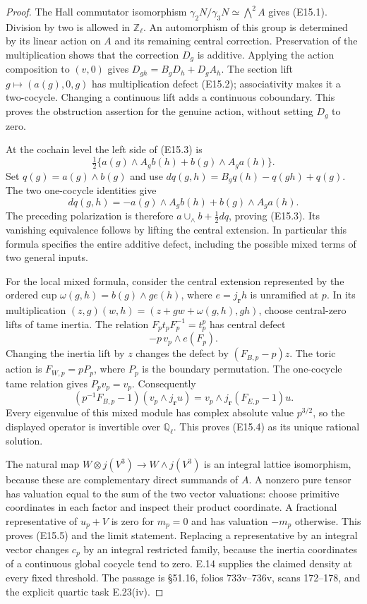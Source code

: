 \begin{proof}
The Hall commutator isomorphism
$\gamma_2N/\gamma_3N\simeq\bigwedge^2A$ gives (E15.1).
Division by two is allowed in $\mathbb Z_\ell$.
An automorphism of this group is determined by its
linear action on $A$ and its remaining central correction.
Preservation of the multiplication shows that the
correction $D_g$ is additive. Applying the action
composition to $(v,0)$ gives
$D_{gh}=B_gD_h+D_gA_h$.
The section lift $g\mapsto(a(g),0,g)$ has multiplication
defect (E15.2); associativity makes it a two-cocycle.
Changing a continuous lift adds a continuous coboundary.
This proves the obstruction assertion for the genuine
action, without setting $D_g$ to zero.

At the cochain level the left side of (E15.3) is
\[
 \tfrac12\{a(g)\wedge A_gb(h)+b(g)\wedge A_ga(h)\}.
\]
Set $q(g)=a(g)\wedge b(g)$ and use
$dq(g,h)=B_gq(h)-q(gh)+q(g)$. The two one-cocycle
identities give
\[
 dq(g,h)=-a(g)\wedge A_gb(h)+b(g)\wedge A_ga(h).
\]
The preceding polarization is therefore
$a\cup_\wedge b+\tfrac12dq$, proving (E15.3).
Its vanishing equivalence follows by lifting the
central extension. In particular this formula
specifies the entire additive defect, including
the possible mixed terms of two general inputs.

For the local mixed formula, consider the central
extension represented by the ordered cup
$\omega(g,h)=b(g)\wedge g e(h)$, where
$e=j_{\mathbf r}h$ is unramified at $p$.
In its multiplication
$(z,g)(w,h)=(z+gw+\omega(g,h),gh)$, choose central-zero
lifts of tame inertia. The relation
$F_pt_pF_p^{-1}=t_p^p$ has central defect
\[
 -p\,v_p\wedge e(F_p).
\]
Changing the inertia lift by $z$ changes the defect by
$(F_{B,p}-p)z$. The toric action is $F_{W,p}=pP_p$,
where $P_p$ is the boundary permutation. The
one-cocycle tame relation gives $P_pv_p=v_p$.
Consequently
\[
 (p^{-1}F_{B,p}-1)
       (v_p\wedge j_{\mathbf r}u)
   =v_p\wedge j_{\mathbf r}(F_{E,p}-1)u.
\]
Every eigenvalue of this mixed module has complex
absolute value $p^{3/2}$, so the displayed operator
is invertible over $\mathbb Q_\ell$. This proves
(E15.4) as its unique rational solution.

The natural map $W\otimes j(V^3)\to W\wedge j(V^3)$
is an integral lattice isomorphism, because these
are complementary direct summands of $A$.
A nonzero pure tensor has valuation equal to the
sum of the two vector valuations: choose primitive
coordinates in each factor and inspect their
product coordinate. A fractional representative of
$u_p+V$ is zero for $m_p=0$ and has valuation $-m_p$
otherwise. This proves (E15.5) and the limit statement.
Replacing a representative by an integral vector
changes $c_p$ by an integral restricted family,
because the inertia coordinates of a continuous
global cocycle tend to zero. E.14 supplies the
claimed density at every fixed threshold.
The passage is \S51.16, folios 733v--736v,
scans 172--178, and the explicit quartic task E.23(iv).
\end{proof}

